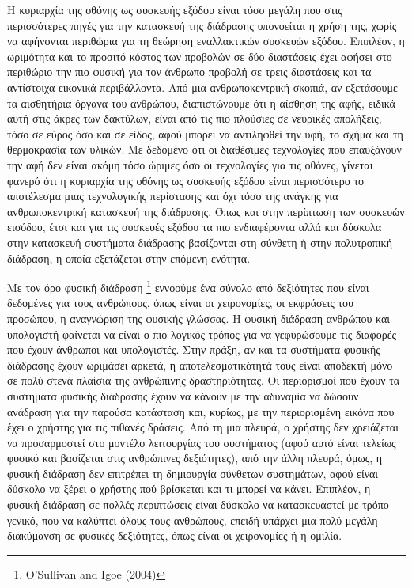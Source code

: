 \documentclass[
]{article}
\begin{document}
Η κυριαρχία της οθόνης ως συσκευής εξόδου είναι τόσο μεγάλη που στις
περισσότερες πηγές για την κατασκευή της διάδρασης υπονοείται η χρήση
της, χωρίς να αφήνονται περιθώρια για τη θεώρηση εναλλακτικών συσκευών
εξόδου. Επιπλέον, η ωριμότητα και το προσιτό κόστος των προβολών σε δύο
διαστάσεις έχει αφήσει στο περιθώριο την πιο φυσική για τον άνθρωπο
προβολή σε τρεις διαστάσεις και τα αντίστοιχα εικονικά περιβάλλοντα. Από
μια ανθρωποκεντρική σκοπιά, αν εξετάσουμε τα αισθητήρια όργανα του
ανθρώπου, διαπιστώνουμε ότι η αίσθηση της αφής, ειδικά αυτή στις άκρες
των δακτύλων, είναι από τις πιο πλούσιες σε νευρικές απολήξεις, τόσο σε
εύρος όσο και σε είδος, αφού μπορεί να αντιληφθεί την υφή, το σχήμα και
τη θερμοκρασία των υλικών. Με δεδομένο ότι οι διαθέσιμες τεχνολογίες που
επαυξάνουν την αφή δεν είναι ακόμη τόσο ώριμες όσο οι τεχνολογίες για
τις οθόνες, γίνεται φανερό ότι η κυριαρχία της οθόνης ως συσκευής εξόδου
είναι περισσότερο το αποτέλεσμα μιας τεχνολογικής περίστασης και όχι
τόσο της ανάγκης για ανθρωποκεντρική κατασκευή της διάδρασης. Όπως και
στην περίπτωση των συσκευών εισόδου, έτσι και για τις συσκευές εξόδου τα
πιο ενδιαφέροντα αλλά και δύσκολα στην κατασκευή συστήματα διάδρασης
βασίζονται στη σύνθετη ή στην πολυτροπική διάδραση, η οποία εξετάζεται
στην επόμενη ενότητα.

Με τον όρο φυσική διάδραση \footnote{O'Sullivan and Igoe (2004)}
εννοούμε ένα σύνολο από δεξιότητες που είναι δεδομένες για τους
ανθρώπους, όπως είναι οι χειρονομίες, οι εκφράσεις του προσώπου, η
αναγνώριση της φυσικής γλώσσας. Η φυσική διάδραση ανθρώπου και
υπολογιστή φαίνεται να είναι ο πιο λογικός τρόπος για να γεφυρώσουμε τις
διαφορές που έχουν άνθρωποι και υπολογιστές. Στην πράξη, αν και τα
συστήματα φυσικής διάδρασης έχουν ωριμάσει αρκετά, η αποτελεσματικότητά
τους είναι αποδεκτή μόνο σε πολύ στενά πλαίσια της ανθρώπινης
δραστηριότητας. Οι περιορισμοί που έχουν τα συστήματα φυσικής διάδρασης
έχουν να κάνουν με την αδυναμία να δώσουν ανάδραση για την παρούσα
κατάσταση και, κυρίως, με την περιορισμένη εικόνα που έχει ο χρήστης για
τις πιθανές δράσεις. Από τη μια πλευρά, ο χρήστης δεν χρειάζεται να
προσαρμοστεί στο μοντέλο λειτουργίας του συστήματος (αφού αυτό είναι
τελείως φυσικό και βασίζεται στις ανθρώπινες δεξιότητες), από την άλλη
πλευρά, όμως, η φυσική διάδραση δεν επιτρέπει τη δημιουργία σύνθετων
συστημάτων, αφού είναι δύσκολο να ξέρει ο χρήστης πού βρίσκεται και τι
μπορεί να κάνει. Επιπλέον, η φυσική διάδραση σε πολλές περιπτώσεις είναι
δύσκολο να κατασκευαστεί με τρόπο γενικό, που να καλύπτει όλους τους
ανθρώπους, επειδή υπάρχει μια πολύ μεγάλη διακύμανση σε φυσικές
δεξιότητες, όπως είναι οι χειρονομίες ή η ομιλία.
\end{document}
